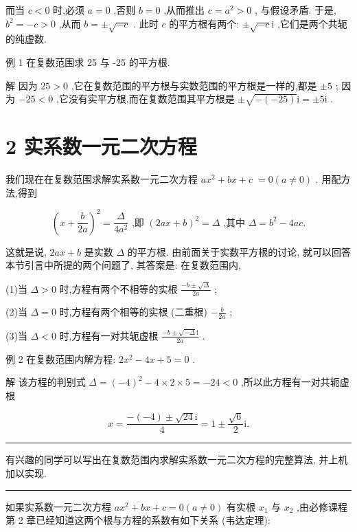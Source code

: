 \documentclass[10pt]{article}
\newcommand{\HRule}{\begin{center}\rule{0.9\linewidth}{0.2mm}\end{center}}
\begin{document}
而当 \(c < 0\) 时,必须 \(a = 0\) ,否则 \(b = 0\) ,从而推出 \(c = {a}^{2} > 0\) , 与假设矛盾. 于是, \({b}^{2} =  - c > 0\) ,从而 \(b =  \pm  \sqrt{-c}\) . 此时 \(c\) 的平方根有两个: \(\pm  \sqrt{-c}\mathrm{i}\) ,它们是两个共轭的纯虚数.

例 1 在复数范围求 25 与 -25 的平方根.

解 因为 \({25} > 0\) ,它在复数范围的平方根与实数范围的平方根是一样的,都是 \(\pm  5\) ; 因为 \(- {25} < 0\) ,它没有实平方根,而在复数范围其平方根是 \(\pm  \sqrt{-\left( {-{25}}\right) }\mathrm{i} =  \pm  5\mathrm{i}\) .

\section*{2 实系数一元二次方程}

我们现在在复数范围求解实系数一元二次方程 \(a{x}^{2} + {bx} + c \; = 0\left( {a \neq  0}\right)\) . 用配方法,得到

\[
{\left( x + \frac{b}{2a}\right) }^{2} = \frac{\Delta }{4{a}^{2}}\text{ ,即 }{\left( 2ax + b\right) }^{2} = \Delta \text{ ,其中 }\Delta  = {b}^{2} - {4ac}.
\]

这就是说, \({2ax} + b\) 是实数 \(\Delta\) 的平方根. 由前面关于实数平方根的讨论, 就可以回答本节引言中所提的两个问题了, 其答案是: 在复数范围内,

(1)当 \(\Delta  > 0\) 时,方程有两个不相等的实根 \(\frac{-b \pm  \sqrt{\Delta }}{2a}\) ;

(2)当 \(\Delta  = 0\) 时,方程有两个相等的实根 (二重根) \(- \frac{b}{2a}\) ;

(3)当 \(\Delta  < 0\) 时,方程有一对共轭虚根 \(\frac{-b \pm  \sqrt{-\Delta }\mathrm{i}}{2a}\) .

例 2 在复数范围内解方程: \(2{x}^{2} - {4x} + 5 = 0\) .

解 该方程的判别式 \(\Delta  = {\left( -4\right) }^{2} - 4 \times  2 \times  5 =  - {24} < 0\) ,所以此方程有一对共轭虚根

\[
x = \frac{-\left( {-4}\right)  \pm  \sqrt{24}\mathrm{i}}{4} = 1 \pm  \frac{\sqrt{6}}{2}\mathrm{i}.
\]

\HRule

有兴趣的同学可以写出在复数范围内求解实系数一元二次方程的完整算法, 并上机加以实现.

\HRule

如果实系数一元二次方程 \(a{x}^{2} + {bx} + c = 0\left( {a \neq  0}\right)\) 有实根 \({x}_{1}\) 与 \({x}_{2}\) ,由必修课程第 2 章已经知道这两个根与方程的系数有如下关系 (韦达定理):
\end{document}
